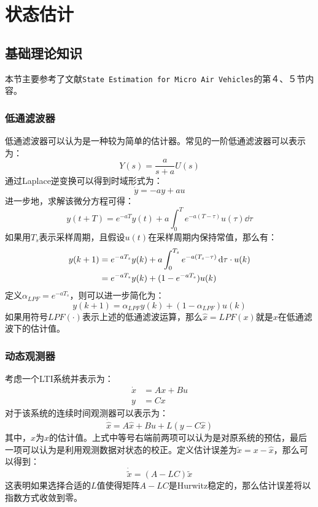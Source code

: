 \chapter{状态估计}
\section{基础理论知识}
本节主要参考了文献\texttt{State Estimation for Micro Air Vehicles}的第４、５节内容。
\subsection{低通滤波器}
低通滤波器可以认为是一种较为简单的估计器。常见的一阶低通滤波器可以表示为：
\begin{equation*}
    Y(s) = \frac{a}{s+a}U(s)
\end{equation*}
通过Laplace逆变换可以得到时域形式为：
\begin{equation}
    \dot{y} = -ay+au
\end{equation}
进一步地，求解该微分方程可得：
\begin{equation*}
    y(t+T) = e^{-aT}y(t) + a\int_0^T{e^{-a(T-\tau)}u(\tau)}\dd{\tau}
\end{equation*}
如果用$T_s$表示采样周期，且假设$u(t)$在采样周期内保持常值，那么有：
\begin{align}
    y(k+1) & = e^{-a T_s} y(k) + a \int_0^{T_s}{e^{-a(T_s-\tau)}}\mathop{}\!\mathrm{d}{\tau} \cdot u(k) \notag \\
    & = e^{-aT_s} y(k) + (1-e^{-aT_s}) u(k)
\end{align}
定义$\alpha_{LPF} = e ^ {-a T_s}$，则可以进一步简化为：
\begin{equation}
    y(k+1) = \alpha_{LPF} y(k) + (1-\alpha_{LPF}) u(k)
\end{equation}
如果用符号$LPF(\cdot)$表示上述的低通滤波运算，那么$\hat{x} = LPF(x)$就是$x$在低通滤波下的估计值。

\subsection{动态观测器}
考虑一个LTI系统并表示为：
\begin{align*}
    \dot{x} & = A x + B u \\
    y & = C x
\end{align*}
对于该系统的连续时间观测器可以表示为：
\begin{equation}
    \dot{\hat{x}} = A \hat{x} + B u + L(y-C\hat{x})
\end{equation}
其中，$\hat{x}$为$x$的估计值。上式中等号右端前两项可以认为是对原系统的预估，最后一项可以认为是利用观测数据对状态的校正。定义估计误差为$\tilde{x} = x - \hat{x}$，那么可以得到：
\begin{equation}
    \dot{\tilde{x}} = (A - L C)\tilde{x}
\end{equation}
这表明如果选择合适的$L$值使得矩阵$A-LC$是Hurwitz稳定的，那么估计误差将以指数方式收敛到零。

